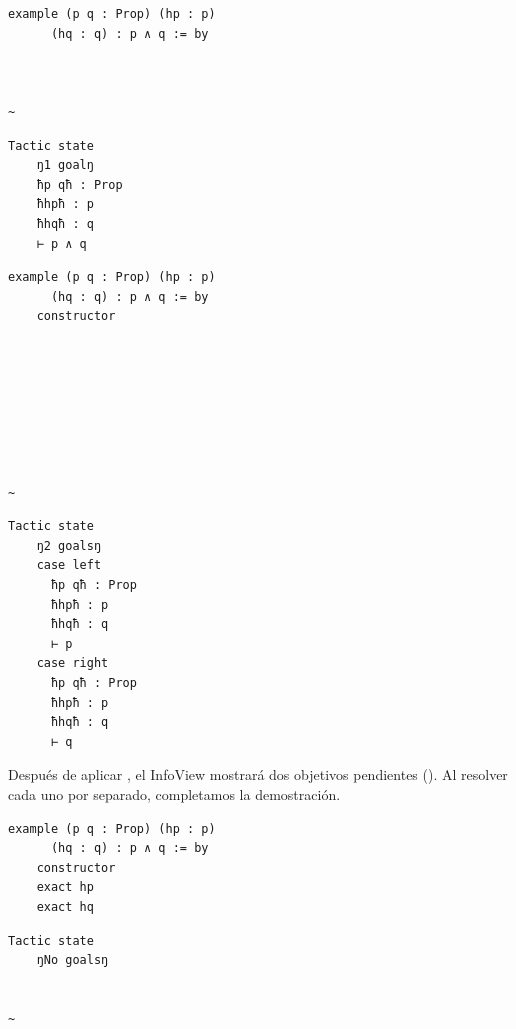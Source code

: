 \begin{minipage}[t]{0.58\textwidth}
\begin{lstlisting}[language=lean]
  example (p q : Prop) (hp : p)
      (hq : q) : p ∧ q := by



~
\end{lstlisting}
\end{minipage}%
\hfill
\begin{minipage}[t]{0.40\textwidth}
\begin{lstlisting}[language=infoview]
  Tactic state
    ŋ1 goalŋ
    ħp qħ : Prop
    ħhpħ : p
    ħhqħ : q
    ⊢ p ∧ q
\end{lstlisting}
\end{minipage}
%
\noindent
\makebox[\textwidth]{$\downarrow$}
%
\begin{minipage}[t]{0.58\textwidth}
\begin{lstlisting}[language=lean]
  example (p q : Prop) (hp : p)
      (hq : q) : p ∧ q := by
    constructor








~
\end{lstlisting}
\end{minipage}%
\hfill
\begin{minipage}[t]{0.40\textwidth}
\begin{lstlisting}[language=infoview]
  Tactic state
    ŋ2 goalsŋ
    case left
      ħp qħ : Prop
      ħhpħ : p
      ħhqħ : q
      ⊢ p
    case right
      ħp qħ : Prop
      ħhpħ : p
      ħhqħ : q
      ⊢ q
\end{lstlisting}
\end{minipage}

Después de aplicar , el InfoView mostrará dos objetivos pendientes (). Al resolver cada uno por separado, completamos la demostración.

\begin{minipage}[t]{0.58\textwidth}
\begin{lstlisting}[language=lean]
  example (p q : Prop) (hp : p)
      (hq : q) : p ∧ q := by
    constructor
    exact hp
    exact hq
\end{lstlisting}
\end{minipage}%
\hfill
\begin{minipage}[t]{0.40\textwidth}
\begin{lstlisting}[language=infoview]
  Tactic state
    ŋNo goalsŋ


~
\end{lstlisting}
\end{minipage}

